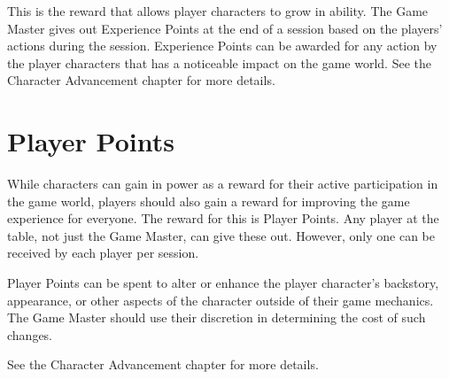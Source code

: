 \begin{multicols}{2}
This is the reward that allows player characters to grow in ability. The Game Master gives
out Experience Points at the end of a session based on the players' actions during the
session. Experience Points can be awarded for any action by the player characters that
has a noticeable impact on the game world. See the Character Advancement chapter for
more details.

\section{Player Points}

While characters can gain in power as a reward for their active participation in the game
world, players should also gain a reward for improving the game experience for everyone.
The reward for this is Player Points. Any player at the table, not just the Game Master,
can give these out. However, only one can be received by each player per session.

Player Points can be spent to alter or enhance the player character's backstory, appearance,
or other aspects of the character outside of their game mechanics. The Game Master should
use their discretion in determining the cost of such changes.

See the Character Advancement chapter for more details.

\end{multicols}
